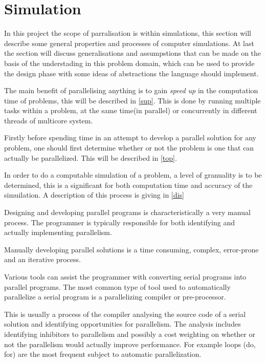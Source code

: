 \section{Simulation}

In this project the scope of parralisation is within simulations, this section will describe some general properties and processes of computer simulations. At last the section will discuss generalisations and assumpstions that can be made on the basis of the understading in this problem domain, which can be used to provide the design phase with some ideas of abstractions the language should implement.

The main benefit of parallelising anything is to gain \emph{speed up} in the computation time of problems, this will be described in \cref{sup}. This is done by running multiple tasks within a problem, at the same time(in parallel) or concurrently in different threads of multicore system.

Firstly before spending time in an attempt to develop a parallel solution for any problem, one should first determine whether or not the problem is one that can actually be parallelized. This will be described in \cref{top}.

  In order to do a computable simulation of a problem, a level of granuality is to be determined, this is a significant for both computation time and accuracy of the simuilation. A description of this process is giving in \cref{dis}

    Designing and developing parallel programs is characteristically a very manual process. The programmer is typically responsible for both identifying and actually implementing parallelism.

    Manually developing parallel solutions is a time consuming, complex, error-prone and an iterative process.

    Various tools can assist the programmer with converting serial programs into parallel programs. The most common type of tool used to automatically parallelize a serial program is a parallelizing compiler or pre-processor.

    This is usually a process of the compiler analysing the source code of a serial solution and identifying opportunities for parallelism.
    The analysis includes identifying inhibitors to parallelism and possibly a cost weighting on whether or not the parallelism would actually improve performance.
    For example loops (do, for) are the most frequent subject to automatic parallelization.
